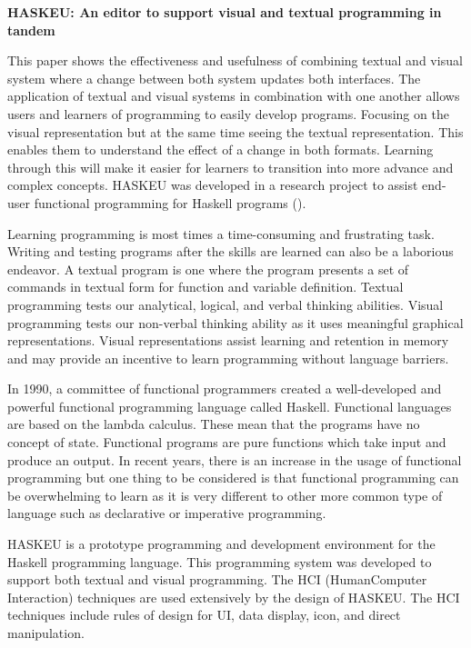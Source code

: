 \flushleft
\textbf{HASKEU: An editor to support visual and textual programming in tandem}\\
\justifying

\parx
This paper shows the effectiveness and usefulness of combining textual and
visual system where a change between both system updates both interfaces. The
application of textual and visual systems in combination with one another allows
users and learners of programming to easily develop programs. Focusing on the
visual representation but at the same time seeing the textual representation.
This enables them to understand the effect of a change in both formats. Learning
through this will make it easier for learners to transition into more advance
and complex concepts. HASKEU was developed in a research project to assist
end-user functional programming for Haskell programs (\cite{alam_bush_2016}).

\parx
Learning programming is most times a time-consuming and frustrating task.
Writing and testing programs after the skills are learned can also be a
laborious endeavor. A textual program is one where the program presents a set
of commands in textual form for function and variable definition. Textual
programming tests our analytical, logical, and verbal thinking abilities. Visual
programming tests our non-verbal thinking ability as it uses meaningful
graphical representations. Visual representations assist learning and retention
in memory and may provide an incentive to learn programming without language
barriers.

\parx
In 1990, a committee of functional programmers created a well-developed and
powerful functional programming language called Haskell. Functional languages
are based on the lambda calculus. These mean that the programs have no concept
of state. Functional programs are pure functions which take input and produce an
output. In recent years, there is an increase in the usage of functional
programming but one thing to be considered is that functional programming can be
overwhelming to learn as it is very different to other more common type of
language such as declarative or imperative programming.

\parx
HASKEU is a prototype programming and development environment for the Haskell
programming language. This programming system was developed to support both
textual and visual programming. The HCI (HumanComputer Interaction) techniques
are used extensively by the design of HASKEU. The HCI techniques include rules
of design for UI, data display, icon, and direct manipulation.

